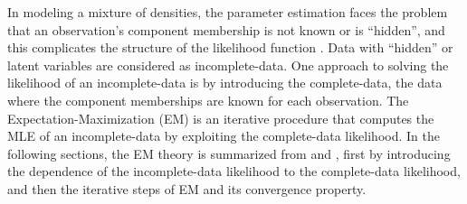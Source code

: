 

    

In modeling a mixture of densities, the parameter estimation faces the problem that an observation's component membership is not known or is ``hidden'', and this complicates the structure of the likelihood function \cite{Kung2004}. Data with ``hidden'' or latent variables are considered as incomplete-data. One approach to solving the likelihood of an incomplete-data is by introducing the complete-data, the data where the component memberships are known for each observation. The Expectation-Maximization (EM) is an iterative procedure that computes the MLE of an incomplete-data by exploiting the complete-data likelihood. In the following sections, the EM theory is summarized from  and , first by introducing the dependence of the incomplete-data likelihood to the complete-data likelihood, and then the iterative steps of EM and its convergence property.


